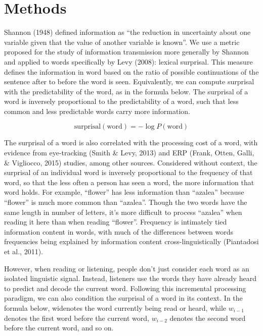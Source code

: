 \documentclass[man,floatsintext]{apa6}
\begin{document}
\hypertarget{methods}{%
\section{Methods}\label{methods}}

Shannon (1948) defined information as \enquote{the reduction in uncertainty about one variable given that the value of another variable is known}. We use a metric proposed for the study of information transmission more generally by Shannon and applied to words specifically by Levy (2008): lexical surprisal. This measure defines the information in word based on the ratio of possible continuations of the sentence after to before the word is seen. Equivalently, we can compute surprisal with the predictability of the word, as in the formula below. The surprisal of a word is inversely proportional to the predictability of a word, such that less common and less predictable words carry more information.

\[\text{surprisal}(\text{word}) = -\log P(\text{word})\]

The surprisal of a word is also correlated with the processing cost of a word, with evidence from eye-tracking (Smith \& Levy, 2013) and ERP (Frank, Otten, Galli, \& Vigliocco, 2015) studies, among other sources. Considered without context, the surprisal of an individual word is inversely proportional to the frequency of that word, so that the less often a person has seen a word, the more information that word holds. For example, \enquote{flower} has less information than \enquote{azalea} because \enquote{flower} is much more common than \enquote{azalea}. Though the two words have the same length in number of letters, it's more difficult to process \enquote{azalea} when reading it here than when reading \enquote{flower}. Frequency is intimately tied information content in words, with much of the differences between words frequencies being explained by information content cross-linguistically (Piantadosi et al., 2011).

However, when reading or listening, people don't just consider each word as an isolated linguistic signal. Instead, listeners use the words they have already heard to predict and decode the current word. Following this incremental processing paradigm, we can also condition the surprisal of a word in its context. In the formula below, widenotes the word currently being read or heard, while \(w_{i-1}\) denotes the first word before the current word, \(w_{i-2}\) denotes the second word before the current word, and so on.
\end{document}
